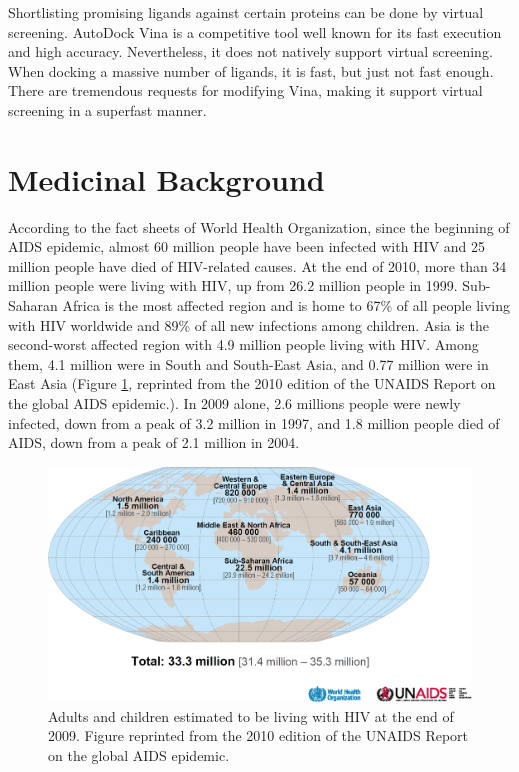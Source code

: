 Shortlisting promising ligands against certain proteins can be done by virtual screening. AutoDock Vina \citep{595-2010} is a competitive tool well known for its fast execution and high accuracy. Nevertheless, it does not natively support virtual screening. When docking a massive number of ligands, it is fast, but just not fast enough. There are tremendous requests for modifying Vina, making it support virtual screening in a superfast manner.

\section{Medicinal Background}

According to the fact sheets of World Health Organization, since the beginning of AIDS epidemic, almost 60 million people have been infected with HIV and 25 million people have died of HIV-related causes. At the end of 2010, more than 34 million people were living with HIV, up from 26.2 million people in 1999. Sub-Saharan Africa is the most affected region and is home to 67\% of all people living with HIV worldwide and 89\% of all new infections among children. Asia is the second-worst affected region with 4.9 million people living with HIV. Among them, 4.1 million were in South and South-East Asia, and 0.77 million were in East Asia (Figure \ref{HIVPopulationDistribution}, reprinted from the 2010 edition of the UNAIDS Report on the global AIDS epidemic.). In 2009 alone, 2.6 millions people were newly infected, down from a peak of 3.2 million in 1997, and 1.8 million people died of AIDS, down from a peak of 2.1 million in 2004.

\begin{figure}
\centering
\includegraphics[width=\textwidth]{VirtualScreening/Figures/HIVPopulationDistribution.png}
\caption{Adults and children estimated to be living with HIV at the end of 2009. Figure reprinted from the 2010 edition of the UNAIDS Report on the global AIDS epidemic.}
\label{HIVPopulationDistribution}
\end{figure}

